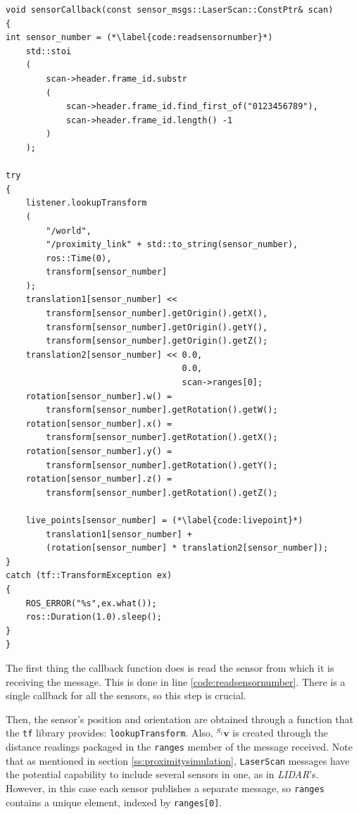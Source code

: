 \begin{lstlisting}[caption={Point localization \textit{C++} algorithm.},captionpos=b]
void sensorCallback(const sensor_msgs::LaserScan::ConstPtr& scan)
{
int sensor_number = (*\label{code:readsensornumber}*)
    std::stoi
    (
        scan->header.frame_id.substr
        (
            scan->header.frame_id.find_first_of("0123456789"),
            scan->header.frame_id.length() -1
        )
    );

try
{
    listener.lookupTransform
    (
        "/world",
        "/proximity_link" + std::to_string(sensor_number),
        ros::Time(0),
        transform[sensor_number]
    );
    translation1[sensor_number] <<
        transform[sensor_number].getOrigin().getX(),
        transform[sensor_number].getOrigin().getY(),
        transform[sensor_number].getOrigin().getZ();
    translation2[sensor_number] << 0.0,
                                   0.0,
                                   scan->ranges[0];
    rotation[sensor_number].w() =
        transform[sensor_number].getRotation().getW();
    rotation[sensor_number].x() =
        transform[sensor_number].getRotation().getX();
    rotation[sensor_number].y() =
        transform[sensor_number].getRotation().getY();
    rotation[sensor_number].z() =
        transform[sensor_number].getRotation().getZ();

    live_points[sensor_number] = (*\label{code:livepoint}*)
        translation1[sensor_number] +
        (rotation[sensor_number] * translation2[sensor_number]);
}
catch (tf::TransformException ex)
{
    ROS_ERROR("%s",ex.what());
    ros::Duration(1.0).sleep();
}
}
\end{lstlisting}

The first thing the callback function does is read the sensor from which it is receiving the message. This is done in line \ref{code:readsensornumber}. There is a single callback for all the sensors, so this step is crucial.

Then, the sensor's position and orientation are obtained through a function that the \lstinline{tf} library provides: \lstinline{lookupTransform}. Also, $^{S_i}\mathbf{v}$ is created through the distance readings packaged in the \lstinline{ranges} member of the message received. Note that as mentioned in section \ref{ss:proximitysimulation}, \lstinline{LaserScan} messages have the potential capability to include several sensors in one, as in \textit{LIDAR}'s. However, in this case each sensor publishes a separate message, so \lstinline{ranges} contains a unique element, indexed by \lstinline{ranges[0]}.

